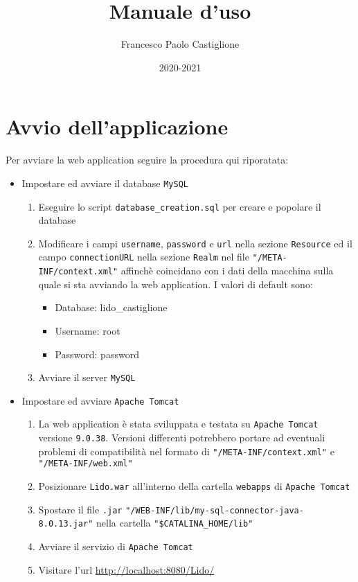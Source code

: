 \documentclass{article}
\title{Manuale d'uso}
\author{Francesco Paolo Castiglione}
\date{2020-2021}
\begin{document}
\maketitle

\tableofcontents
\newpage
\section{Avvio dell'applicazione}

Per avviare la web application seguire la procedura qui riporatata:

\begin{itemize}
	\item Impostare ed avviare il database \texttt{MySQL}
	\begin{enumerate}
		\item Eseguire lo script \texttt{database\_creation.sql} per creare e popolare il database
		\item Modificare i campi \texttt{username}, \texttt{password} e \texttt{url} nella sezione \texttt{Resource} ed il campo \texttt{connectionURL} nella sezione \texttt{Realm} nel file \texttt{"/META-INF/context.xml"} affinchè coincidano con i dati della macchina sulla quale si sta avviando la web application.\newline	
		I valori di default sono:
		\begin{itemize}
			\item Database: lido\_castiglione
			\item Username: root
			\item Password: password
		\end{itemize}
		\item Avviare il server \texttt{MySQL}
	\end{enumerate}
	\item Impostare ed avviare \texttt{Apache Tomcat}
	\begin{enumerate}
		\item La web application è stata sviluppata e testata su \texttt{Apache Tomcat} versione \texttt{9.0.38}. Versioni differenti potrebbero portare ad eventuali problemi di compatibilità nel formato di \texttt{"/META-INF/context.xml"} e \texttt{"/META-INF/web.xml"}
		\item Posizionare \texttt{Lido.war} all'interno della cartella \texttt{webapps} di \texttt{Apache Tomcat}
		\item Spostare il file \texttt{.jar} \texttt{"/WEB-INF/lib/my-sql-connector-java-8.0.13.jar"} nella cartella \texttt{"\$CATALINA\_HOME/lib"}
		\item Avviare il servizio di \texttt{Apache Tomcat}
		\item Visitare l'url \url{http://localhost:8080/Lido/}
	\end{enumerate}
\end{itemize}
\newpage
\end{document}
